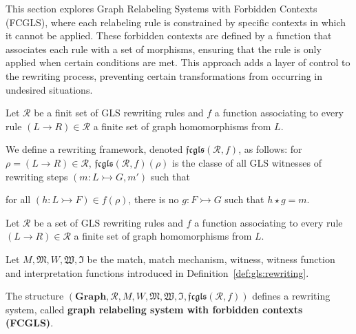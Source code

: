       This section explores Graph Relabeling Systems with Forbidden Contexts (FCGLS), where each relabeling rule is constrained by specific contexts in which it cannot be applied. These forbidden contexts are defined by a function that associates each rule with a set of morphisms, ensuring that the rule is only applied when certain conditions are met. This approach adds a layer of control to the rewriting process, preventing certain transformations from occurring in undesired situations.
     
      \cite{litovsky1999graph}
      
      \begin{definition}
        Let $\mathcal{R}$ be a finit set of GLS rewriting rules and $f$ a function associating to every rule $(L \mathop{\rightarrow} R) \mathop{\in} \mathcal{R}$ a finite set of graph homomorphisms from $L$.
      
        We define a rewriting framework, denoted $\mathfrak{fcgls}(\mathcal{R},f)$, as follows: for $\rho \mathop{=} (L \mathop{\rightarrow} R) \mathop{\in} \mathcal{R}$, $\mathfrak{fcgls}(\mathcal{R},f)(\rho)$ is the classe of all GLS witnesses of rewriting steps
        $\left(  m: L \rightarrowtail G, m'  \right)$ such that 
      
        for all $(h : L \rightarrowtail F) \mathop{\in} f(\rho)$, there is no $g:F \rightarrowtail G$ such that $h \mathop{\star} g \mathop{=} m$.
      \end{definition}

      
      \begin{definition}
        Let $\mathcal{R}$ be a set of GLS rewriting rules and $f$ a function associating to every rule $(L \mathop{\rightarrow} R) \mathop{\in} \mathcal{R}$ a finite set of graph homomorphisms from $L$.

        Let $M, \mathfrak{M}, W , \mathfrak{W}, \mathfrak{I}$ be the match, match mechanism, witness, witness function and interpretation functions introduced in Definition~\ref{def:gls:rewriting}.
      
        The structure $(\mathbf{Graph},\mathcal{R},M,W,\mathfrak{M},\mathfrak{W},\mathfrak{I}, \mathfrak{fcgls}(\mathcal{R},f))$ defines a rewriting system, called \textbf{graph relabeling system with forbidden contexts (FCGLS)}. 
      \end{definition} 
      
